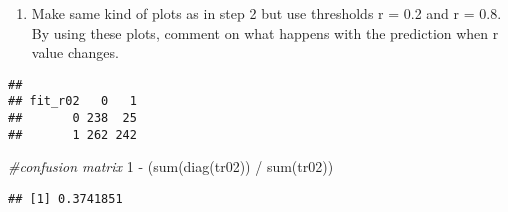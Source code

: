 \documentclass[
]{article}
\newenvironment{Shaded}{\begin{snugshade}}{\end{snugshade}}
\newcommand{\CommentTok}[1]{\textcolor[rgb]{0.56,0.35,0.01}{\textit{#1}}}
\newcommand{\DecValTok}[1]{\textcolor[rgb]{0.00,0.00,0.81}{#1}}
\newcommand{\FloatTok}[1]{\textcolor[rgb]{0.00,0.00,0.81}{#1}}
\newcommand{\FunctionTok}[1]{\textcolor[rgb]{0.00,0.00,0.00}{#1}}
\newcommand{\NormalTok}[1]{#1}
\newcommand{\OtherTok}[1]{\textcolor[rgb]{0.56,0.35,0.01}{#1}}
\newcommand{\SpecialCharTok}[1]{\textcolor[rgb]{0.00,0.00,0.00}{#1}}
\providecommand{\tightlist}{%
  \setlength{\itemsep}{0pt}\setlength{\parskip}{0pt}}
\begin{document}
\begin{enumerate}
\def\labelenumi{\arabic{enumi}.}
\setcounter{enumi}{3}
\tightlist
\item
  Make same kind of plots as in step 2 but use thresholds r = 0.2 and r
  = 0.8. By using these plots, comment on what happens with the
  prediction when r value changes.
\end{enumerate}

\begin{Shaded}
\end{Shaded}

\begin{verbatim}
##        
## fit_r02   0   1
##       0 238  25
##       1 262 242
\end{verbatim}

\begin{Shaded}
\begin{Highlighting}[]
\CommentTok{\#confusion matrix}
\DecValTok{1} \SpecialCharTok{{-}}\NormalTok{ (}\FunctionTok{sum}\NormalTok{(}\FunctionTok{diag}\NormalTok{(tr02)) }\SpecialCharTok{/} \FunctionTok{sum}\NormalTok{(tr02))}
\end{Highlighting}
\end{Shaded}

\begin{verbatim}
## [1] 0.3741851
\end{verbatim}
\end{document}
